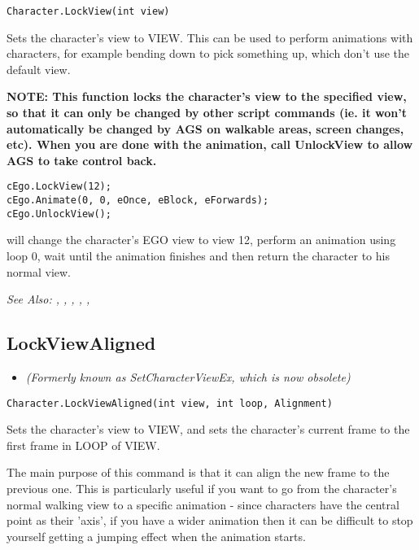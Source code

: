 \begin{verbatim}
Character.LockView(int view)
\end{verbatim}

Sets the character's view to VIEW. This can be used to perform animations
with characters, for example bending down to pick something up, which don't
use the default view.

\bf{NOTE:} This function locks the character's view to the specified view, so
that it can only be changed by other script commands (ie. it won't
automatically be changed by AGS on walkable areas, screen changes,
etc). When you are done with the animation, call UnlockView to allow AGS to
take control back.

\begin{verbatim}
cEgo.LockView(12);
cEgo.Animate(0, 0, eOnce, eBlock, eForwards);
cEgo.UnlockView();
\end{verbatim}
will change the character's EGO view to view 12, perform an animation using loop 0,
wait until the animation finishes and then return the character to his normal view.

\it{See Also:} ,
,
,
,
,


\subsection{LockViewAligned}\label{Character.LockViewAligned}%

\begin{itemize}
\item \it{(Formerly known as SetCharacterViewEx, which is now obsolete)}
\end{itemize}

\begin{verbatim}
Character.LockViewAligned(int view, int loop, Alignment)
\end{verbatim}

Sets the character's view to VIEW, and sets the character's current frame to
the first frame in LOOP of VIEW.

The main purpose of this command is that it can align the new frame to the previous one.
This is particularly useful if you want to go from the character's normal walking view to
a specific animation - since characters have the central point as their 'axis', if
you have a wider animation then it can be difficult to stop yourself getting a jumping
effect when the animation starts.

